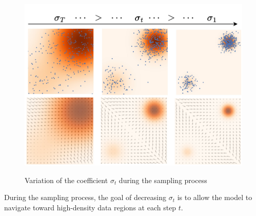 \begin{figure}[h]
	\includegraphics[width=\linewidth]{images/NoiseScale}
	\label{fig:NoiseScale}
	\caption{Variation of the coefficient $\sigma_t$ during the sampling process}
\end{figure}
During the sampling process, the goal of decreasing $\sigma_t$ is to allow the model to navigate toward high-density data regions at each step $t$.

